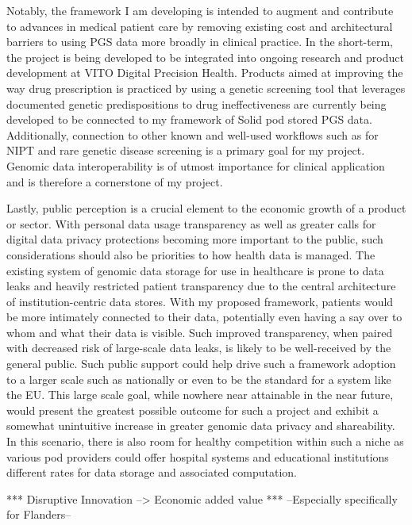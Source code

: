\documentclass[a4paper,11pt]{article}
\begin{document}
Notably, the framework I am developing is intended to augment and contribute to advances in medical patient care by removing existing cost and architectural barriers to using PGS data more broadly in clinical practice. 
In the short-term, the project is being developed to be integrated into ongoing research and product development at VITO Digital Precision Health. 
Products aimed at improving the way drug prescription is practiced by using a genetic screening tool that leverages documented genetic predispositions to drug ineffectiveness are currently being developed to be connected to my framework of Solid pod stored PGS data. 
Additionally, connection to other known and well-used workflows such as for NIPT and rare genetic disease screening is a primary goal for my project. 
Genomic data interoperability is of utmost importance for clinical application and is therefore a cornerstone of my project. 

Lastly, public perception is a crucial element to the economic growth of a product or sector. With personal data usage transparency as well as greater calls for digital data privacy protections becoming more important to the public, such considerations should also be priorities to how health data is managed. 
The existing system of genomic data storage for use in healthcare is prone to data leaks and heavily restricted patient transparency due to the central architecture of institution-centric data stores. 
With my proposed framework, patients would be more intimately connected to their data, potentially even having a say over to whom and what their data is visible. 
Such improved transparency, when paired with decreased risk of large-scale data leaks, is likely to be well-received by the general public. 
Such public support could help drive such a framework adoption to a larger scale such as nationally or even to be the standard for a system like the EU. 
This large scale goal, while nowhere near attainable in the near future, would present the greatest possible outcome for such a project and exhibit a somewhat unintuitive increase in greater genomic data privacy and shareability. 
In this scenario, there is also room for healthy competition within such a niche as various pod providers could offer hospital systems and educational institutions different rates for data storage and associated computation.

*** Disruptive Innovation --> Economic added value ***
	--Especially specifically for Flanders–


\end{document}
